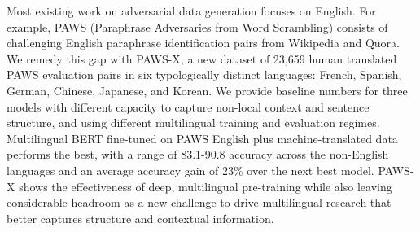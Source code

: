 Most existing work on adversarial data generation focuses on English. For example, PAWS (Paraphrase Adversaries from Word Scrambling) consists of challenging English paraphrase identification pairs from Wikipedia and Quora. We remedy this gap with PAWS-X, a new dataset of 23,659 human translated PAWS evaluation pairs in six typologically distinct languages: French, Spanish, German, Chinese, Japanese, and Korean.  We provide baseline numbers for three models with different capacity to capture non-local context and sentence structure, and using different multilingual training and evaluation regimes. Multilingual BERT fine-tuned on PAWS English plus machine-translated data performs the best, with a range of 83.1-90.8 accuracy across the non-English languages and an average accuracy gain of 23\% over the next best model. PAWS-X shows the effectiveness of deep, multilingual pre-training while also leaving considerable headroom as a new challenge to drive multilingual research that better captures structure and contextual information.